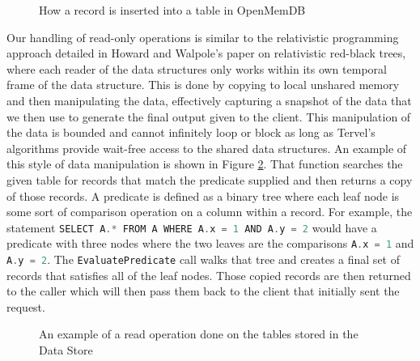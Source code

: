 \documentclass[letter,11pt]{article}
\let\oldReturn\Return
\renewcommand{\Return}{\State\oldReturn}
\newcommand{\inlinecode}[1]{\colorbox{codegrey}{\lstinline[language=C++]{#1}}}
\begin{document}
\begin{figure}
 \begin{algorithmic}
 \EndIf
  \State{}
 \EndFor
 \State{}
 \EndFunction
 \end{algorithmic}
 \caption{How a record is inserted into a table in OpenMemDB}
 \label{insert_record}
\end{figure}

\par\vspace{\baselineskip}
Our handling of read-only operations is similar to the relativistic programming approach detailed 
in Howard and Walpole's paper on relativistic red-black trees, where each reader of the 
data structures only works within its own temporal frame of the data structure\cite{rbtree}. 
This is done by copying to local unshared memory and then manipulating the data, 
effectively capturing a snapshot of the data that we then use to generate the final 
output given to the client. This manipulation of the data is bounded and cannot 
infinitely loop or block as long as Tervel's algorithms provide wait-free access 
to the shared data structures. An example of this style of data manipulation is shown in 
Figure \ref{read_op}. That function searches the given table for records that match
the predicate supplied and then returns a copy of those records. A predicate is defined
as a binary tree where each leaf node is some sort of comparison operation on a column
within a record. For example, the statement \inlinecode{SELECT A.* FROM A WHERE A.x = 1 AND A.y = 2}
would have a predicate with three nodes where the two leaves are the comparisons
\inlinecode{A.x = 1} and \inlinecode{A.y = 2}. The \inlinecode{EvaluatePredicate} call
walks that tree and creates a final set of records that satisfies all of the
leaf nodes. Those copied records are then returned to the caller which will then
pass them back to the client that initially sent the request.

\begin{figure}[h]
 \begin{algorithmic}
  \EndFor
 \Else
 \EndIf
 \EndFunction
 \end{algorithmic}
 \caption{An example of a read operation done on the tables stored in the Data Store}
 \label{read_op}
\end{figure}
\end{document}
